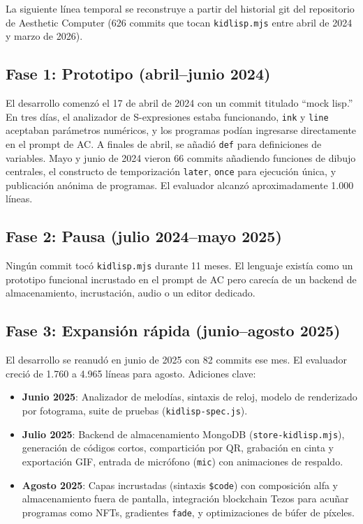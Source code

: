 \documentclass[10pt,letterpaper,twocolumn]{article}
\begin{document}
La siguiente línea temporal se reconstruye a partir del historial git del repositorio de Aesthetic Computer (626 commits que tocan \texttt{kidlisp.mjs} entre abril de 2024 y marzo de 2026).

\subsection{Fase 1: Prototipo (abril--junio 2024)}

El desarrollo comenzó el 17 de abril de 2024 con un commit titulado ``mock lisp.'' En tres días, el analizador de S-expresiones estaba funcionando, \texttt{ink} y \texttt{line} aceptaban parámetros numéricos, y los programas podían ingresarse directamente en el prompt de AC. A finales de abril, se añadió \texttt{def} para definiciones de variables. Mayo y junio de 2024 vieron 66 commits añadiendo funciones de dibujo centrales, el constructo de temporización \texttt{later}, \texttt{once} para ejecución única, y publicación anónima de programas. El evaluador alcanzó aproximadamente 1.000 líneas.

\subsection{Fase 2: Pausa (julio 2024--mayo 2025)}

Ningún commit tocó \texttt{kidlisp.mjs} durante 11 meses. El lenguaje existía como un prototipo funcional incrustado en el prompt de AC pero carecía de un backend de almacenamiento, incrustación, audio o un editor dedicado.

\subsection{Fase 3: Expansión rápida (junio--agosto 2025)}

El desarrollo se reanudó en junio de 2025 con 82 commits ese mes. El evaluador creció de 1.760 a 4.965 líneas para agosto. Adiciones clave:

\begin{itemize}
  \item \textbf{Junio 2025}: Analizador de melodías, sintaxis de reloj, modelo de renderizado por fotograma, suite de pruebas (\texttt{kidlisp-spec.js}).
  \item \textbf{Julio 2025}: Backend de almacenamiento MongoDB (\texttt{store-kidlisp.mjs}), generación de códigos cortos, compartición por QR, grabación en cinta y exportación GIF, entrada de micrófono (\texttt{mic}) con animaciones de respaldo.
  \item \textbf{Agosto 2025}: Capas incrustadas (sintaxis \texttt{\$code}) con composición alfa y almacenamiento fuera de pantalla, integración blockchain Tezos para acuñar programas como NFTs, gradientes \texttt{fade}, y optimizaciones de búfer de píxeles.
\end{itemize}
\end{document}

